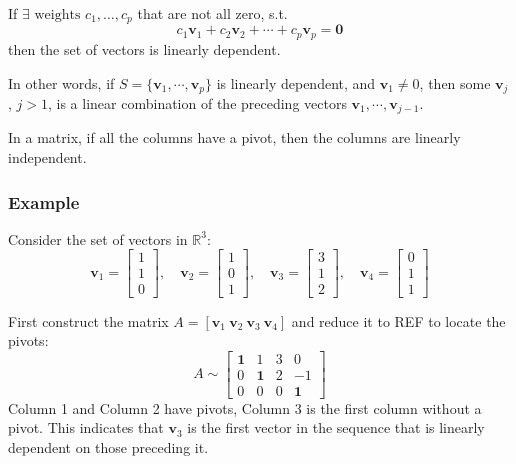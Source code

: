 \documentclass[../linear-algebra.tex]{subfiles}
\begin{document}
\noindent If $\exists \text{ weights } c_1,\ldots,c_p$ that are not all zero, s.t.
\[c_1\mathbf{v}_1 + c_2\mathbf{v}_2 +\cdots+ c_p\mathbf{v}_p = \mathbf{0}\]
then the set of vectors is linearly dependent.

\noindent In other words, if $S = \{\mathbf{v}_1,\cdots,\mathbf{v}_p\}$ is linearly dependent,
and $\mathbf{v}_1 \neq 0$, then some $\mathbf{v}_j$, $j>1$, is a linear combination of 
the preceding vectors $\mathbf{v}_1,\cdots,\mathbf{v}_{j-1}$.

\smallskip
\noindent In a matrix, if all the columns have a pivot, then the columns are linearly independent.

\subsubsection{Example}

Consider the set of vectors in $\mathbb{R}^3$:
\[
\mathbf{v}_1 = \begin{bmatrix} 1 \\ 1 \\ 0 \end{bmatrix}, \quad 
\mathbf{v}_2 = \begin{bmatrix} 1 \\ 0 \\ 1 \end{bmatrix}, \quad 
\mathbf{v}_3 = \begin{bmatrix} 3 \\ 1 \\ 2 \end{bmatrix}, \quad 
\mathbf{v}_4 = \begin{bmatrix} 0 \\ 1 \\ 1 \end{bmatrix}
\]

\noindent First construct the matrix $A = [\mathbf{v}_1 \ \mathbf{v}_2 \ \mathbf{v}_3 \ \mathbf{v}_4]$ and reduce it to REF to locate the pivots:
\[
A \sim \begin{bmatrix} 
\mathbf{1} & 1 & 3 & 0 \\ 
0 & \mathbf{1} & 2 & -1 \\ 
0 & 0 & 0 & \mathbf{1} 
\end{bmatrix}
\]
Column 1 and Column 2 have pivots, Column 3 is the first column without a pivot.
This indicates that $\mathbf{v}_3$ is the first vector in the sequence that is linearly dependent on those preceding it.
\end{document}

